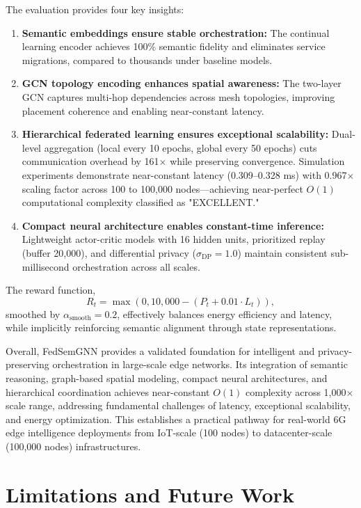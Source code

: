 \documentclass[conference]{IEEEtran}
\begin{document}
	The evaluation provides four key insights:
	\begin{enumerate}
		\item \textbf{Semantic embeddings ensure stable orchestration:} The continual learning encoder achieves 100\% semantic fidelity and eliminates service migrations, compared to thousands under baseline models.
		\item \textbf{GCN topology encoding enhances spatial awareness:} The two-layer GCN captures multi-hop dependencies across mesh topologies, improving placement coherence and enabling near-constant latency.
		\item \textbf{Hierarchical federated learning ensures exceptional scalability:} Dual-level aggregation (local every 10 epochs, global every 50 epochs) cuts communication overhead by 161× while preserving convergence. Simulation experiments demonstrate near-constant latency (0.309--0.328 ms) with 0.967$\times$ scaling factor across 100 to 100,000 nodes—achieving near-perfect $O(1)$ computational complexity classified as "EXCELLENT."
		\item \textbf{Compact neural architecture enables constant-time inference:} Lightweight actor-critic models with 16 hidden units, prioritized replay (buffer 20,000), and differential privacy ($\sigma_{\text{DP}} = 1.0$) maintain consistent sub-millisecond orchestration across all scales.
	\end{enumerate}
	
	The reward function,
	\[
	R_t = \max(0, 10{,}000 - (P_t + 0.01 \cdot L_t)),
	\]
	smoothed by $\alpha_{\text{smooth}} = 0.2$, effectively balances energy efficiency and latency, while implicitly reinforcing semantic alignment through state representations.
	
	Overall, FedSemGNN provides a validated foundation for intelligent and privacy-preserving orchestration in large-scale edge networks. Its integration of semantic reasoning, graph-based spatial modeling, compact neural architectures, and hierarchical coordination achieves near-constant $O(1)$ complexity across 1,000$\times$ scale range, addressing fundamental challenges of latency, exceptional scalability, and energy optimization. This establishes a practical pathway for real-world 6G edge intelligence deployments from IoT-scale (100 nodes) to datacenter-scale (100,000 nodes) infrastructures.
	
	\section{Limitations and Future Work}
	\label{sec:limitations_future}
	
\end{document}
